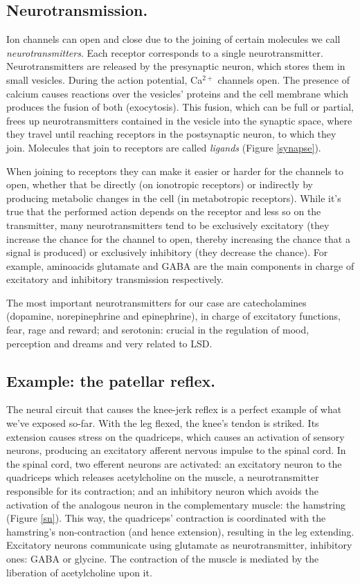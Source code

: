 \subsection{Neurotransmission.}

Ion channels can open and close due to the joining of certain molecules we call \textit{neurotransmitters}. Each receptor corresponds to a single neurotransmitter. Neurotransmitters are released by the presynaptic neuron, which stores them in small vesicles. During the action potential, Ca$^{2+}$ channels open. The presence of calcium causes reactions over the vesicles' proteins and the cell membrane which produces the fusion of both (exocytosis). This fusion, which can be full or partial, frees up neurotransmitters contained in the vesicle into the synaptic space, where they travel until reaching receptors in the postsynaptic neuron, to which they join. Molecules that join to receptors are called \textit{ligands} (Figure \ref{synapse}).

When joining to receptors they can make it easier or harder for the channels to open, whether that be directly (on ionotropic receptors) or indirectly by producing metabolic changes in the cell (in metabotropic receptors). While it's true that the performed action depends on the receptor and less so on the transmitter, many neurotransmitters tend to be exclusively excitatory (they increase the chance for the channel to open, thereby increasing the chance that a signal is produced) or exclusively inhibitory (they decrease the chance). For example, aminoacids glutamate and GABA are the main components in charge of excitatory and inhibitory transmission respectively.

The most important neurotransmitters for our case are catecholamines (dopamine, norepinephrine and epinephrine), in charge of excitatory functions, fear, rage and reward; and serotonin: crucial in the regulation of mood, perception and dreams and very related to LSD.

\subsection{Example: the patellar reflex.}

The neural circuit that causes the knee-jerk reflex is a perfect example of what we've exposed so-far. With the leg flexed, the knee's tendon is striked. Its extension causes stress on the quadriceps, which causes an activation of sensory neurons, producing an excitatory afferent nervous impulse to the spinal cord. In the spinal cord, two efferent neurons are activated: an excitatory neuron to the quadriceps which releases acetylcholine on the muscle, a neurotransmitter responsible for its contraction; and an inhibitory neuron which avoids the activation of the analogous neuron in the complementary muscle: the hamstring (Figure \ref{sn}). This way, the quadriceps' contraction is coordinated with the hamstring's non-contraction (and hence extension), resulting in the leg extending. Excitatory neurons communicate using glutamate as neurotransmitter, inhibitory ones: GABA or glycine. The contraction of the muscle is mediated by the liberation of acetylcholine upon it.

